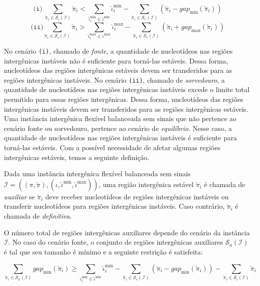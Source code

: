 $$\texttt{(i)}~\sum_{\breve\pi_i \in \mathcal{S}_{i}(\mathcal{I})} \breve\pi_i < \sum_{\breve\iota_{i}^{\min}  \in \breve\iota^{\min}} \breve\iota_{i}^{\min} - \sum_{\breve\pi_i \in \mathcal{S}_{e}(\mathcal{I})} (\breve\pi_i - gap_{\min}(\breve\pi_i))$$
$$\texttt{(ii)}\sum_{\breve\pi_i \in \mathcal{S}_{i}(\mathcal{I})} \breve\pi_i > \sum_{\breve\iota_{i}^{\max}  \in \breve\iota^{\max}} \breve\iota_{i}^{\max} - \sum_{\breve\pi_i \in \mathcal{S}_{e}(\mathcal{I})} (\breve\pi_i + gap_{\max}(\breve\pi_i))$$

No cenário \texttt{(i)}, chamado de \emph{fonte}, a quantidade de nucleotídeos nas regiões intergênicas instáveis não é suficiente para torná-las estáveis. Dessa forma, nucleotídeos das regiões intergênicas estáveis devem ser transferidos para as regiões intergênicas instáveis. No cenário \texttt{(ii)}, chamado de \emph{sorvedouro}, a quantidade de nucleotídeos nas regiões intergênicas instáveis excede o limite total permitido para essas regiões intergênicas. Dessa forma, nucleotídeos das regiões intergênicas instáveis devem ser transferidos para as regiões intergênicas estáveis. Uma instância intergênica flexível balanceada sem sinais que não pertence ao cenário fonte ou sorvedouro, pertence ao cenário de \emph{equilíbrio}. Nesse caso, a quantidade de nucleotídeos nas regiões intergênicas instáveis é suficiente para torná-las estáveis. Com a possível necessidade de afetar algumas regiões intergênicas estáveis, temos a seguinte definição. 

\begin{definition}
  Dada uma instância intergênica flexível balanceada sem sinais $\mathcal{I} = ((\pi,\breve\pi),(\iota,\breve\iota^{\min},\breve\iota^{\max}))$, uma região intergênica estável $\breve\pi_i$ é chamada de \emph{auxiliar} se $\breve\pi_i$ deve receber nucleotídeos de regiões intergênicas instáveis ou transferir nucleotídeos para regiões intergênicas instáveis. Caso contrário, $\breve\pi_i$ é chamada de \emph{definitiva}.
\end{definition}

O número total de regiões intergênicas auxiliares depende do cenário da instância $\mathcal{I}$. No caso do cenário fonte, o conjunto de regiões intergênicas auxiliares $\mathcal{S}_{a}(\mathcal{I})$ é tal que seu tamanho é mínimo e a seguinte restrição é satisfeita:

$$\sum_{\breve\pi_i \in \mathcal{S}_{a}(\mathcal{I})} gap_{\min}(\breve\pi_i) \ge \sum_{\breve\iota_{i}^{\min}  \in \breve\iota^{\min}} \breve\iota_{i}^{\min} - \sum_{\breve\pi_i \in \mathcal{S}_{e}(\mathcal{I})} (\breve\pi_i - gap_{\min}(\breve\pi_i)) - \sum_{\breve\pi_i \in \mathcal{S}_{i}(\mathcal{I})} \breve\pi_i$$

